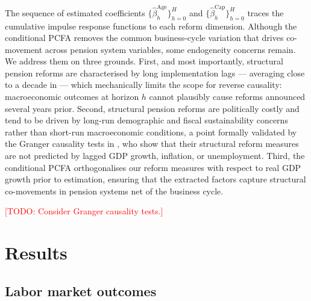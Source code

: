 \documentclass[11pt,english,a4paper, twoside, authoryear]{article}
\begin{document}
The sequence of estimated coefficients $\{\hat{\beta}^{\text{Age}}_h\}_{h=0}^{H}$ and $\{\hat{\beta}^{\text{Cap}}_h\}_{h=0}^{H}$ traces the cumulative impulse response functions to each reform dimension. Although the conditional PCFA removes the common business-cycle variation that drives co-movement across pension system variables, some endogeneity concerns remain. We address them on three grounds. First, and most importantly, structural pension reforms are characterised by long implementation lags --- averaging close to a decade in \citet{BiZubairy2023} --- which mechanically limits the scope for reverse causality: macroeconomic outcomes at horizon
$h$ cannot plausibly cause reforms announced several years prior. Second, structural pension reforms are politically costly and tend to be driven by long-run demographic and fiscal sustainability concerns rather than short-run macroeconomic conditions, a point formally validated by the Granger causality tests in \citet{BiZubairy2023}, who show that their structural reform measures are not predicted by lagged GDP growth, inflation, or unemployment. Third, the conditional PCFA orthogonalises our reform measures with respect to real GDP growth prior to estimation, ensuring that the extracted factors capture structural co-movements in pension systems net of the business cycle. 


\textcolor{red}{[TODO: Consider Granger causality tests.]}

\section{Results}
\label{sec:results}

\FloatBarrier
\subsection{Labor market outcomes}
\label{sec:labor}
\label{sec:labor}
\end{document}
